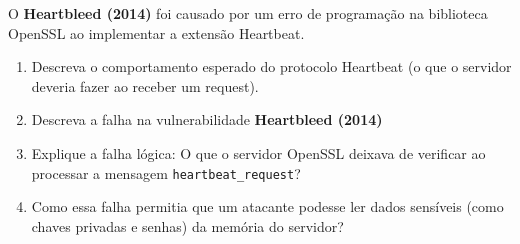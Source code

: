 O \textbf{Heartbleed (2014)}  foi causado por um erro de programação na biblioteca OpenSSL ao implementar a extensão Heartbeat.

\begin{enumerate}
    \item Descreva o comportamento esperado do protocolo Heartbeat (o que o servidor deveria fazer ao receber um request).
    \item Descreva a falha na vulnerabilidade \textbf{Heartbleed (2014)}
    \item Explique a falha lógica: O que o servidor OpenSSL deixava de verificar ao processar a mensagem \texttt{heartbeat\_request}?
    \item Como essa falha permitia que um atacante podesse ler dados sensíveis (como chaves privadas e senhas) da memória do servidor?
\end{enumerate}
